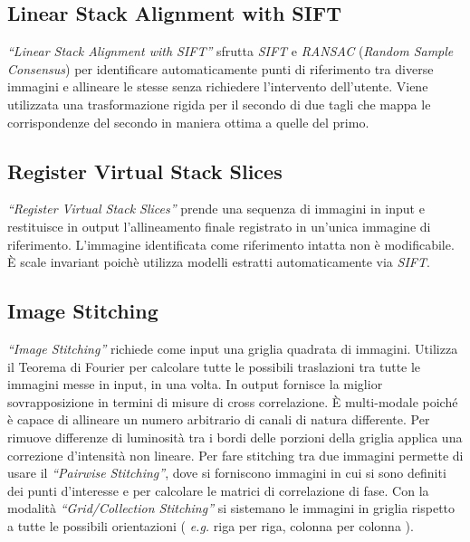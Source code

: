 \subsection{Linear Stack Alignment with SIFT}
\textit{``Linear Stack Alignment with SIFT''} sfrutta \textit{SIFT} e \textit{RANSAC} (\textit{Random Sample Consensus}) per identificare automaticamente punti di riferimento tra diverse immagini e allineare le stesse senza richiedere l'intervento dell'utente. Viene utilizzata una trasformazione rigida per il secondo di due tagli che mappa le corrispondenze del secondo in maniera ottima a quelle del primo.

\subsection{Register Virtual Stack Slices}
\textit{``Register Virtual Stack Slices''} prende una sequenza di immagini in input e restituisce in output l'allineamento finale registrato in un'unica immagine di riferimento. L'immagine identificata come riferimento intatta non è modificabile. È scale invariant poichè utilizza modelli estratti automaticamente via \textit{SIFT}.

\subsection{Image Stitching}
\textit{``Image Stitching''} richiede come input una griglia quadrata di immagini. Utilizza il Teorema di Fourier per calcolare tutte le possibili traslazioni tra tutte le immagini messe in input, in una volta. In output fornisce la miglior sovrapposizione in termini di misure di cross correlazione. È multi-modale poiché è capace di allineare un numero arbitrario di canali di natura differente. Per rimuove differenze di luminosità tra i bordi delle porzioni della griglia applica una correzione d'intensità non lineare. Per fare stitching tra due immagini permette di usare il \textit{``Pairwise Stitching''}, dove si forniscono immagini in cui si sono definiti dei punti d'interesse e per calcolare le matrici di correlazione di fase.
Con la modalità \textit{``Grid/Collection Stitching''} si sistemano le immagini in griglia rispetto a tutte le possibili orientazioni ( \textit{e.g.} riga per riga, colonna per colonna ).

